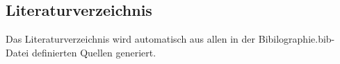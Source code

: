 \subsection{Literaturverzeichnis}\label{sec:}

Das Literaturverzeichnis wird automatisch aus allen in der Bibilographie.bib-Datei definierten Quellen generiert.
